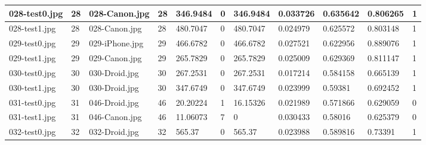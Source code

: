 \begin{landscape}
\begin{longtable}{|p{2cm}|p{1cm}|p{2cm}|p{1cm}|p{2cm}|p{1cm}|p{2cm}|p{2cm}|p{2cm}|p{2cm}|p{1cm}|}
		028-test0.jpg   & 28               & 028-Canon.jpg         & 28                          & 346.9484              & 0                       & 346.9484                   & 0.033726              & 0.635642              & 0.806265                 & 1                \\ \hline
		028-test1.jpg   & 28               & 028-Canon.jpg         & 28                          & 480.7047              & 0                       & 480.7047                   & 0.024979              & 0.625572              & 0.803148                 & 1                \\ \hline
		029-test0.jpg   & 29               & 029-iPhone.jpg        & 29                          & 466.6782              & 0                       & 466.6782                   & 0.027521              & 0.622956              & 0.889076                 & 1                \\ \hline
		029-test1.jpg   & 29               & 029-Canon.jpg         & 29                          & 265.7829              & 0                       & 265.7829                   & 0.025009              & 0.629369              & 0.811147                 & 1                \\ \hline
		030-test0.jpg   & 30               & 030-Droid.jpg         & 30                          & 267.2531              & 0                       & 267.2531                   & 0.017214              & 0.584158              & 0.665139                 & 1                \\ \hline
		030-test1.jpg   & 30               & 030-Droid.jpg         & 30                          & 347.6749              & 0                       & 347.6749                   & 0.023999              & 0.59381               & 0.692452                 & 1                \\ \hline
		031-test0.jpg   & 31               & 046-Droid.jpg         & 46                          & 20.20224              & 1                       & 16.15326                   & 0.021989              & 0.571866              & 0.629059                 & 0                \\ \hline
		031-test1.jpg   & 31               & 046-Canon.jpg         & 46                          & 11.06073              & 7                       & 0                          & 0.030433              & 0.58016               & 0.625379                 & 0                \\ \hline
		032-test0.jpg   & 32               & 032-Droid.jpg         & 32                          & 565.37                & 0                       & 565.37                     & 0.023988              & 0.589816              & 0.73391                  & 1                \\ \hline

\end{longtable}
\end{landscape}
